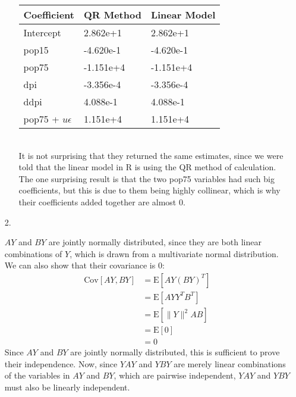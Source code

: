 \documentclass[11pt]{article}
\newcommand{\E}{\mathrm{E}}
\newcommand{\cov}{\mathrm{Cov}}
\theoremstyle{definition}
\begin{document}
\begin{itemize}
\begin{itemize}
\begin{tabular}{l | l l}
                    Coefficient & QR Method & Linear Model  \\
                    \hline
                    Intercept           &  2.862e+1    &   2.862e+1\\
                    pop15               & -4.620e-1    &  -4.620e-1\\
                    pop75               & -1.151e+4    &  -1.151e+4\\
                    dpi                 & -3.356e-4    &  -3.356e-4\\
                    ddpi                &  4.088e-1    &   4.088e-1\\
                    pop75 + $u\epsilon$ &  1.151e+4    &   1.151e+4
                \end{tabular} \\
                It is not surprising that they returned the same estimates, since we were told that the linear model in R is using the QR method of calculation. The one surprising result is that the two pop75 variables had such big coefficients, but this is due to them being highly collinear, which is why their coefficients added together are almost $0$.  
        \end{itemize}
    \item[2.]
       
        $AY$ and $BY$ are jointly normally distributed, since they are both linear combinations of $Y$, which is drawn from a multivariate normal distribution. We can also show that their covariance is $0$:
        \begin{align*}
            \cov[AY,BY]&=\E[AY(BY)^T] \\
                       &=\E[AYY^TB^T] \\
                       &=\E[\|Y\|^2AB] \\
                       &=\E[0] \\
                       &=0
        \end{align*}
        Since $AY$ and $BY$ are jointly normally distributed, this is sufficient to prove their independence. Now, since $YAY$ and $YBY$ are merely linear combinations of the variables in $AY$ and $BY$, which are pairwise independent, $YAY$ and $YBY$ must also be linearly independent.


\end{itemize}
\end{document}
